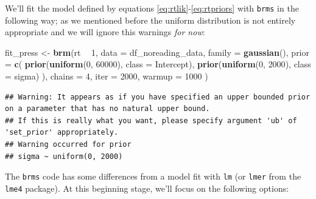 \documentclass[12pt,]{krantz}
\newenvironment{Shaded}{\begin{snugshade}}{\end{snugshade}}
\newcommand{\DataTypeTok}[1]{\textcolor[rgb]{0.13,0.29,0.53}{#1}}
\newcommand{\DecValTok}[1]{\textcolor[rgb]{0.00,0.00,0.81}{#1}}
\newcommand{\KeywordTok}[1]{\textcolor[rgb]{0.13,0.29,0.53}{\textbf{#1}}}
\newcommand{\NormalTok}[1]{#1}
\newcommand{\OperatorTok}[1]{\textcolor[rgb]{0.81,0.36,0.00}{\textbf{#1}}}
\newcommand{\StringTok}[1]{\textcolor[rgb]{0.31,0.60,0.02}{#1}}
\theoremstyle{definition}
\theoremstyle{definition}
\theoremstyle{definition}
\theoremstyle{remark}
\begin{document}
We'll fit the model defined by equations \eqref{eq:rtlik}-\eqref{eq:rtpriors} with \texttt{brms} in the following way; as we mentioned before the uniform distribution is not entirely appropriate and we will ignore this warnings \emph{for now}:

\begin{Shaded}
\begin{Highlighting}[]
\NormalTok{fit_press <-}\StringTok{ }\KeywordTok{brm}\NormalTok{(rt }\OperatorTok{~}\StringTok{ }\DecValTok{1}\NormalTok{,}
  \DataTypeTok{data =}\NormalTok{ df_noreading_data,}
  \DataTypeTok{family =} \KeywordTok{gaussian}\NormalTok{(),}
  \DataTypeTok{prior =} \KeywordTok{c}\NormalTok{(}
    \KeywordTok{prior}\NormalTok{(}\KeywordTok{uniform}\NormalTok{(}\DecValTok{0}\NormalTok{, }\DecValTok{60000}\NormalTok{), }\DataTypeTok{class =}\NormalTok{ Intercept),}
    \KeywordTok{prior}\NormalTok{(}\KeywordTok{uniform}\NormalTok{(}\DecValTok{0}\NormalTok{, }\DecValTok{2000}\NormalTok{), }\DataTypeTok{class =}\NormalTok{ sigma)}
\NormalTok{  ),}
  \DataTypeTok{chains =} \DecValTok{4}\NormalTok{,}
  \DataTypeTok{iter =} \DecValTok{2000}\NormalTok{,}
  \DataTypeTok{warmup =} \DecValTok{1000}
\NormalTok{)}
\end{Highlighting}
\end{Shaded}

\begin{verbatim}
## Warning: It appears as if you have specified an upper bounded prior on a parameter that has no natural upper bound.
## If this is really what you want, please specify argument 'ub' of 'set_prior' appropriately.
## Warning occurred for prior 
## sigma ~ uniform(0, 2000)
\end{verbatim}

The \texttt{brms} code has some differences from a model fit with \texttt{lm} (or \texttt{lmer} from the \texttt{lme4} package). At this beginning stage, we'll focus on the following options:
\end{document}
